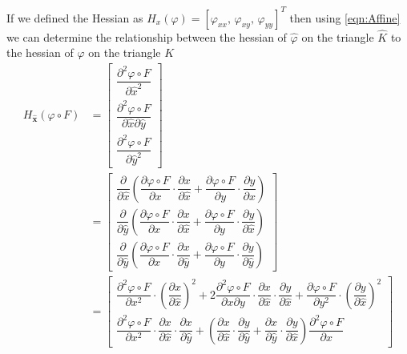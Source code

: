 If we defined the Hessian as $H_x(\varphi) = \left[ \varphi_{xx},\,
\varphi_{xy},\, \varphi_{yy}\right]^T$ then using \eqref{eqn:Affine} we can
determine the relationship between the hessian of $\hat{\varphi}$ on the
triangle $\hat{K}$ to the hessian of $\varphi$ on the triangle $K$
\begin{align*}
  H_{\mathbf{\hat{x}}}(\varphi\circ F) &= \begin{bmatrix}
    \dfrac{\partial^2 \varphi\circ F}{\partial \hat{x}^2} \\[1em]
    \dfrac{\partial^2 \varphi\circ F}{\partial \hat{x} \partial\hat{y}} \\[1em]
    \dfrac{\partial^2 \varphi\circ F}{\partial \hat{y}^2}
  \end{bmatrix} \\
  &= \begin{bmatrix}
    \dfrac{\partial}{\partial \hat{x}}\left( \dfrac{\partial \varphi\circ
      F}{\partial x}\cdot \dfrac{\partial x}{\partial \hat{x}} + \dfrac{\partial
      \varphi\circ F}{\partial y}\cdot \dfrac{\partial y}{\partial
      \hat{x}} \right) \\[1em]
    \dfrac{\partial}{\partial \hat{y}}\left( \dfrac{\partial \varphi\circ
      F}{\partial x}\cdot \dfrac{\partial x}{\partial \hat{x}} + \dfrac{\partial
      \varphi\circ F}{\partial y}\cdot \dfrac{\partial y}{\partial
      \hat{x}} \right) \\[1em]
    \dfrac{\partial}{\partial \hat{y}}\left( \dfrac{\partial \varphi\circ
      F}{\partial x}\cdot \dfrac{\partial x}{\partial \hat{y}} + \dfrac{\partial
      \varphi\circ F}{\partial y}\cdot \dfrac{\partial y}{\partial
      \hat{y}} \right)
  \end{bmatrix} \\
  &= \begin{bmatrix}
    \dfrac{\partial^2 \varphi\circ F}{\partial x^2}\cdot \left(\dfrac{\partial
      x}{\partial \hat{x}}\right)^2 + 2 \dfrac{\partial^2 \varphi\circ F}{\partial x
      \partial y} \cdot \dfrac{\partial x}{\partial \hat{x}} \cdot
      \dfrac{\partial y}{\partial \hat{x}} + \dfrac{\partial \varphi\circ
      F}{\partial y^2}\cdot \left(\dfrac{\partial y}{\partial \hat{x}}\right)^2 \\[1em]
    \dfrac{\partial^2 \varphi\circ F}{\partial x^2}\cdot \dfrac{\partial
      x}{\partial \hat{x}}\cdot \dfrac{\partial x}{\partial \hat{y}} + \left(
      \dfrac{\partial x}{\partial \hat{x}}\cdot \dfrac{\partial y}{\partial
      \hat{y}} + \dfrac{\partial x}{\partial \hat{y}}\cdot
      \dfrac{\partial y}{\partial \hat{x}} \right) \dfrac{\partial^2 \varphi\circ F}{\partial x
}
\end{bmatrix}
\end{align*}
